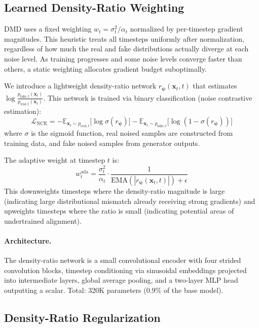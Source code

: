 \documentclass{article}
\theoremstyle{plain}
\theoremstyle{remark}
\newcommand{\E}{\mathbb{E}}
\newcommand{\bx}{\mathbf{x}}
\newcommand{\bpsi}{\boldsymbol{\psi}}
\begin{document}
\subsection{Learned Density-Ratio Weighting}
\label{sec:density_ratio}

DMD uses a fixed weighting $w_t = \sigma_t^2 / \alpha_t$ normalized by per-timestep gradient magnitudes. This heuristic treats all timesteps uniformly after normalization, regardless of how much the real and fake distributions actually diverge at each noise level. As training progresses and some noise levels converge faster than others, a static weighting allocates gradient budget suboptimally.

We introduce a lightweight density-ratio network $r_{\bpsi}(\bx_t, t)$ that estimates $\log\frac{p_{\text{fake},t}(\bx_t)}{p_{\text{real},t}(\bx_t)}$. This network is trained via binary classification (noise contrastive estimation):
\begin{equation}
\mathcal{L}_{\text{NCE}} = -\E_{\bx_t \sim p_{\text{real},t}}\!\bigl[\log \sigma(r_{\bpsi})\bigr] - \E_{\bx_t \sim p_{\text{fake},t}}\!\bigl[\log(1 - \sigma(r_{\bpsi}))\bigr]
\label{eq:nce}
\end{equation}
where $\sigma$ is the sigmoid function, real noised samples are constructed from training data, and fake noised samples from generator outputs.

The adaptive weight at timestep $t$ is:
\begin{equation}
w_t^{\text{ada}} = \frac{\sigma_t^2}{\alpha_t} \cdot \frac{1}{\text{EMA}(|r_{\bpsi}(\bx_t, t)|) + \epsilon}
\label{eq:ada_weight}
\end{equation}
This downweights timesteps where the density-ratio magnitude is large (indicating large distributional mismatch already receiving strong gradients) and upweights timesteps where the ratio is small (indicating potential areas of undertrained alignment).

\paragraph{Architecture.} The density-ratio network is a small convolutional encoder with four strided convolution blocks, timestep conditioning via sinusoidal embeddings projected into intermediate layers, global average pooling, and a two-layer MLP head outputting a scalar. Total: 320K parameters (0.9\% of the base model).

\subsection{Density-Ratio Regularization}
\label{sec:dr_reg}
\end{document}
